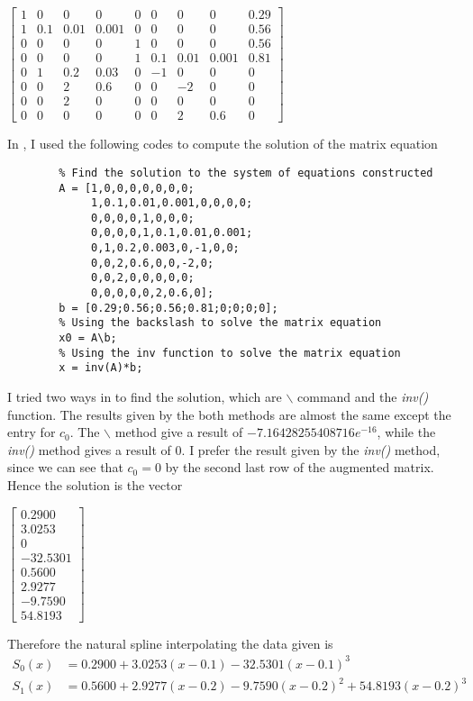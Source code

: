 \begin{answer}
    \begin{center}
    $\left[\begin{matrix}
        1 & 0 & 0 & 0 & 0 & 0 & 0 & 0 & 0.29\\
        1 & 0.1 & 0.01 & 0.001 & 0 & 0 & 0 & 0 & 0.56\\
        0 & 0 & 0 & 0 & 1 & 0 & 0 & 0 & 0.56\\
        0 & 0 & 0 & 0 & 1 & 0.1 & 0.01 & 0.001 & 0.81\\
        0 & 1 & 0.2 & 0.03 & 0 & -1 & 0 & 0 & 0 \\
        0 & 0 & 2 & 0.6 & 0 & 0 & -2 & 0 & 0\\
        0 & 0 & 2 & 0 & 0 & 0 & 0 & 0 & 0\\
        0 & 0 & 0 & 0 & 0 & 0 & 2 & 0.6 & 0
    \end{matrix}\right]$
    \end{center}
    
    In \MATLAB, I used the following codes to compute the solution of the matrix equation
    \begin{verbatim}
        % Find the solution to the system of equations constructed
        A = [1,0,0,0,0,0,0,0;
             1,0.1,0.01,0.001,0,0,0,0;
             0,0,0,0,1,0,0,0;
             0,0,0,0,1,0.1,0.01,0.001;
             0,1,0.2,0.003,0,-1,0,0;
             0,0,2,0.6,0,0,-2,0;
             0,0,2,0,0,0,0,0;
             0,0,0,0,0,2,0.6,0];
        b = [0.29;0.56;0.56;0.81;0;0;0;0];
        % Using the backslash to solve the matrix equation
        x0 = A\b;
        % Using the inv function to solve the matrix equation
        x = inv(A)*b;
    \end{verbatim}
    I tried two ways in \MATLAB to find the solution, which are $\backslash$ command and the \textit{inv()} function. The results given by the both methods are almost the same except the entry for $c_0$. The $\backslash$ method give a result of $-7.16428255408716e^{-16}$, while the \textit{inv()} method gives a result of $0$. I prefer the result given by the \textit{inv()} method, since we can see that $c_0 = 0$ by the second last row of the augmented matrix.
    Hence the solution is the vector
    \begin{center}
        $\left[\begin{matrix}
        0.2900\\
        3.0253\\
        0\\
        -32.5301\\
        0.5600\\
        2.9277\\
        -9.7590\\
        54.8193
        \end{matrix}\right]$
    \end{center}
    Therefore the natural spline interpolating the data given is
    \begin{align}
        S_0(x) &= 0.2900 + 3.0253(x-0.1) - 32.5301(x-0.1)^3\\
        S_1(x) &= 0.5600 + 2.9277(x-0.2) - 9.7590(x-0.2)^2 + 54.8193(x-0.2)^3
    \end{align}
\end{answer}